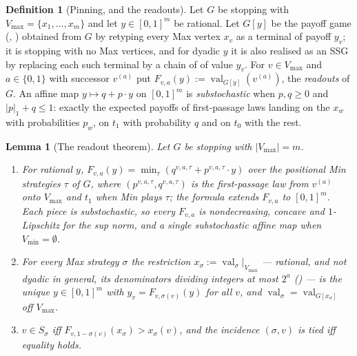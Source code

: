 \documentclass[11pt]{article}
\theoremstyle{plain}
\newtheorem{lemma}[theorem]{Lemma}
\theoremstyle{definition}
\newtheorem{definition}[theorem]{Definition}
\DeclareMathOperator{\val}{val}
\newcommand{\Vmax}{V_{\max}}
\newcommand{\Vmin}{V_{\min}}
\begin{document}
\begin{definition}[Pinning, and the readouts]\label{def:readout}
Let $G$ be stopping with $\Vmax=\{x_1,\dots,x_m\}$ and let
$y\in[0,1]^{m}$ be rational. Let $G[y]$ be the payoff game
(, ) obtained from $G$ by retyping
every Max vertex $x_v$ as a terminal of payoff $y_v$; it is stopping with
no Max vertices, and for dyadic $y$ it is also realised as an SSG by
replacing each such terminal by a chain of  of
value $y_v$. For $v\in\Vmax$
and $a\in\{0,1\}$ with successor $v^{(a)}$ put
$F_{v,a}(y):=\val_{G[y]}(v^{(a)})$, the \emph{readouts} of $G$. An affine
map $y\mapsto q+p\cdot y$ on $[0,1]^{m}$ is \emph{substochastic} when
$p,q\ge0$ and $|p|_1+q\le1$: exactly the expected payoffs of first-passage
laws landing on the $x_w$ with probabilities $p_w$, on $t_1$ with
probability $q$ and on $t_0$ with the rest.
\end{definition}

\begin{lemma}[The readout theorem]\label{lem:readout}
Let $G$ be stopping with $|\Vmax|=m$.
\begin{enumerate}[label=(\alph*),leftmargin=2.2em]
\item For rational $y$,
      $F_{v,a}(y)=\min_{\tau}(q^{v,a,\tau}+p^{v,a,\tau}\cdot y)$ over the
      positional Min strategies $\tau$ of $G$, where
      $(p^{v,a,\tau},q^{v,a,\tau})$ is the first-passage law from
      $v^{(a)}$ onto $\Vmax$ and $t_1$ when Min plays $\tau$; the formula
      extends $F_{v,a}$ to $[0,1]^{m}$. Each piece is substochastic, so
      every $F_{v,a}$ is nondecreasing, concave and $1$-Lipschitz for the
      sup norm, and a single substochastic affine map when
      $\Vmin=\emptyset$.
\item For every Max strategy $\sigma$ the restriction
      $x_\sigma:=\val_\sigma|_{\Vmax}$ --- rational, and not dyadic in
      general, its denominators dividing integers at most $2^{a}$
      () --- is the unique $y\in[0,1]^{m}$ with
      $y_v=F_{v,\sigma(v)}(y)$ for all $v$, and $\val_\sigma=\val_{G[x_\sigma]}$
      off $\Vmax$.
\item $v\in S_\sigma$ iff $F_{v,1-\sigma(v)}(x_\sigma)>x_\sigma(v)$, and
      the incidence $(\sigma,v)$ is tied iff equality holds.
\end{enumerate}
\end{lemma}
\end{document}

